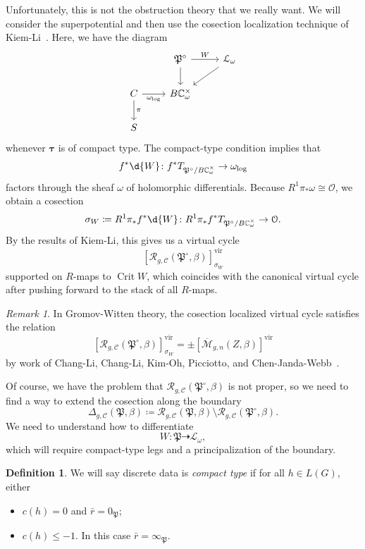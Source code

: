 \documentclass[10pt]{amsart}
\theoremstyle{definition}
\newtheorem{defn}[thm]{Definition}
\theoremstyle{remark}
\newtheorem{rmk}[thm]{Remark}
\theoremstyle{plain}
\theoremstyle{definition}
\theoremstyle{remark}
\newcommand{\C}{\mathbb{C}}
\newcommand{\Mbar}{\overline{\mathcal{M}}}
\newcommand{\mc}[1]{\mathcal{#1}}
\newcommand{\mf}[1]{\mathfrak{#1}}
\newcommand{\btau}{\bm{\tau}}
\newcommand{\mr}[1]{\mathrm{#1}}
\newcommand{\1}{\mathbf{1}}
\newcommand{\2}{\mathbf{2}}
\newcommand{\3}{\mathbf{3}}
\newcommand{\vir}{\mr{vir}}
\DeclareMathOperator{\Crit}{Crit}
\begin{document}
Unfortunately, this is not the obstruction theory that we really want. We will consider the superpotential and then use the cosection localization technique of Kiem-Li~\cite{cosection}. Here, we have the diagram
\begin{equation*}
\begin{tikzcd}
    & \mf{P}^{\circ} \ar{r}{W} \ar{d} & \mc{L}_{\omega} \ar{dl} \\
    C \ar[swap]{r}{\omega_{\log}} \ar{d}{\pi} & B \C_{\omega}^{\times} \\
    S
\end{tikzcd}
\end{equation*}
whenever $\btau$ is of compact type. The compact-type condition implies that
\[ f^* \d{W} \colon f^* T_{\mf{P}^{\circ}/B\C_{\omega}^{\times}} \to \omega_{\log} \]
factors through the sheaf $\omega$ of holomorphic differentials. Because $R^1 \pi_* \omega \cong \mc{O}$, we obtain a cosection
\[ \sigma_W \coloneqq R^1 \pi_* f^* \d{W} \colon R^1 \pi_* f^* T_{\mf{P}^{\circ}/B \C_{\omega}^{\times}} \to \mc{O}. \]
By the results of Kiem-Li, this gives us a virtual cycle
\[ [\mc{R}_{g, \mc{C}}(\mf{P}^{\circ}, \beta)]^{\vir}_{\sigma_W} \]
supported on $R$-maps to $\Crit W$,
which coincides with the canonical virtual cycle after pushing forward to the stack of all $R$-maps.

\begin{rmk}
    In Gromov-Witten theory, the cosection localized virtual cycle satisfies the relation
    \[ [ \mc{R}_{g, \mc{C}}(\mf{P}^{\circ},\beta) ]^{\vir}_{\sigma_W} = \pm [\Mbar_{g,n}(Z,\beta)]^{\vir} \]
    by work of Chang-Li, Chang-Li, Kim-Oh, Picciotto, and Chen-Janda-Webb~\cite{pfieldschangli,clqmap,localizedchern,rpthesis,cjw}.
\end{rmk}

Of course, we have the problem that $\mc{R}_{g, \mc{C}}(\mf{P}^{\circ}, \beta)$ is not proper, so we need to find a way to extend the cosection along the boundary
\[ \Delta_{g, \mc{C}} (\mf{P}, \beta) \coloneqq \mc{R}_{g, \mc{C}}(\mf{P}, \beta) \setminus \mc{R}_{g,\mc{C}}(\mf{P}^{\circ}, \beta). \]
We need to understand how to differentiate
\[ W \colon \mf{P} \dashrightarrow \mc{L}_{\omega}, \]
which will require compact-type legs and a principalization of the boundary.

\begin{defn}
    We will say discrete data is \textit{compact type} if for all $h \in L(G)$, either
    \begin{itemize}
        \item $c(h) = 0$ and $\bar{r} = 0_{\mf{P}}$;
        \item $c(h) \leq -1$. In this case $\bar{r} = \infty_{\mf{P}}$.
    \end{itemize}
\end{defn}
\end{document}
